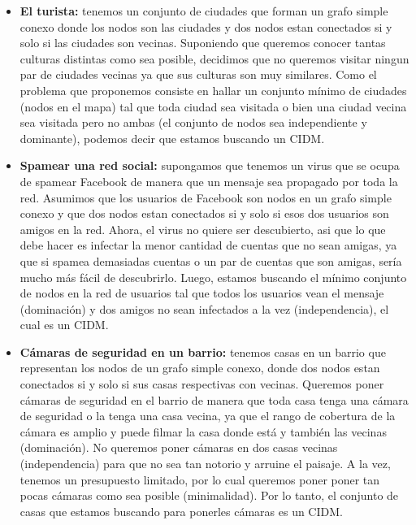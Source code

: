 \begin{itemize}
\item \textbf{El turista:} tenemos un conjunto de ciudades que forman un grafo simple conexo donde los nodos son las ciudades y dos nodos estan conectados si y solo si las ciudades son vecinas. Suponiendo que queremos conocer tantas culturas distintas como sea posible, decidimos que no queremos visitar ningun par de ciudades vecinas ya que sus culturas son muy similares. Como el problema que proponemos consiste en hallar un conjunto mínimo de ciudades (nodos en el mapa) tal que toda ciudad sea visitada o bien una ciudad vecina sea visitada pero no ambas (el conjunto de nodos sea independiente y dominante), podemos decir que estamos buscando un CIDM.
\item \textbf{Spamear una red social:} supongamos que tenemos un virus que se ocupa de spamear Facebook de manera que un mensaje sea propagado por toda la red. Asumimos que los usuarios de Facebook son nodos en un grafo simple conexo y que dos nodos estan conectados si y solo si esos dos usuarios son amigos en la red. Ahora, el virus no quiere ser descubierto, asi que lo que debe hacer es infectar la menor cantidad de cuentas que no sean amigas, ya que si spamea demasiadas cuentas o un par de cuentas que son amigas, sería mucho más fácil de descubrirlo. Luego, estamos buscando el mínimo conjunto de nodos en la red de usuarios tal que todos los usuarios vean el mensaje (dominación) y dos amigos no sean infectados a la vez (independencia), el cual es un CIDM.
\item \textbf{Cámaras de seguridad en un barrio:} tenemos casas en un barrio que representan los nodos de un grafo simple conexo, donde dos nodos estan conectados si y solo si sus casas respectivas con vecinas. Queremos poner cámaras de seguridad en el barrio de manera que toda casa tenga una cámara de seguridad o la tenga una casa vecina, ya que el rango de cobertura de la cámara es amplio y puede filmar la casa donde está y también las vecinas (dominación). No queremos poner cámaras en dos casas vecinas (independencia) para que no sea tan notorio y arruine el paisaje. A la vez, tenemos un presupuesto limitado, por lo cual queremos poner poner tan pocas cámaras como sea posible (minimalidad). Por lo tanto, el conjunto de casas que estamos buscando para ponerles cámaras es un CIDM.
\end{itemize}